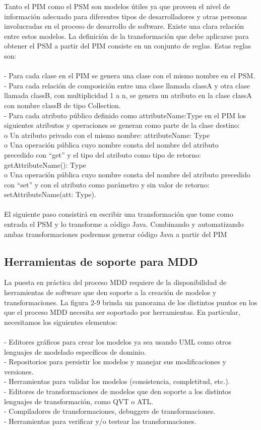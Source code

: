 Tanto el PIM como el PSM son modelos útiles ya que proveen el nivel de información adecuado para diferentes tipos de desarrolladores y otras personas involucradas en el proceso de desarrollo de software. Existe una clara relación entre estos modelos. La definición de la transformación que debe aplicarse para obtener el PSM a partir del PIM consiste en un conjunto de reglas. Estas reglas son: \\\\
- Para cada clase en el PIM se genera una clase con el mismo nombre en el PSM. \\
- Para cada relación de composición entre una clase llamada classA y otra clase llamada classB, con multiplicidad 1 a n, se genera un atributo en la clase classA con nombre classB de tipo Collection. \\
- Para cada atributo público definido como attributeName:Type en el PIM los siguientes atributos y operaciones se generan como parte de la clase destino:\\ 
o Un atributo privado con el mismo nombre: attributeName: Type\\ 
o Una operación pública cuyo nombre consta del nombre del atributo\\ precedido con “get” y el tipo del atributo como tipo de retorno: getAttributeName(): Type \\
o Una operación pública cuyo nombre consta del nombre del atributo precedido con “set” y con el atributo como parámetro y sin valor de retorno: setAttributeName(att: Type). \\\\
El siguiente paso consistirá en escribir una transformación que tome como entrada el PSM y lo transforme a código Java. Combinando y automatizando ambas transformaciones podremos generar código Java a partir del PIM

\subsection{Herramientas de soporte para MDD}
 La puesta en práctica del proceso MDD requiere de la disponibilidad de herramientas de software que den soporte a la creación de modelos y transformaciones. La figura 2-9 brinda un panorama de los distintos puntos en los que el proceso MDD necesita ser soportado por herramientas. En particular, necesitamos los siguientes elementos:\\\\ 
- Editores gráficos para crear los modelos ya sea usando UML como otros lenguajes de modelado específicos de dominio.\\
- Repositorios para persistir los modelos y manejar sus modificaciones y versiones. \\
- Herramientas para validar los modelos (consistencia, completitud, etc.).\\
- Editores de transformaciones de modelos que den soporte a los distintos lenguajes de transformación, como QVT o ATL.\\
- Compiladores de transformaciones, debuggers de transformaciones.\\
- Herramientas para verificar y/o testear las transformaciones.

